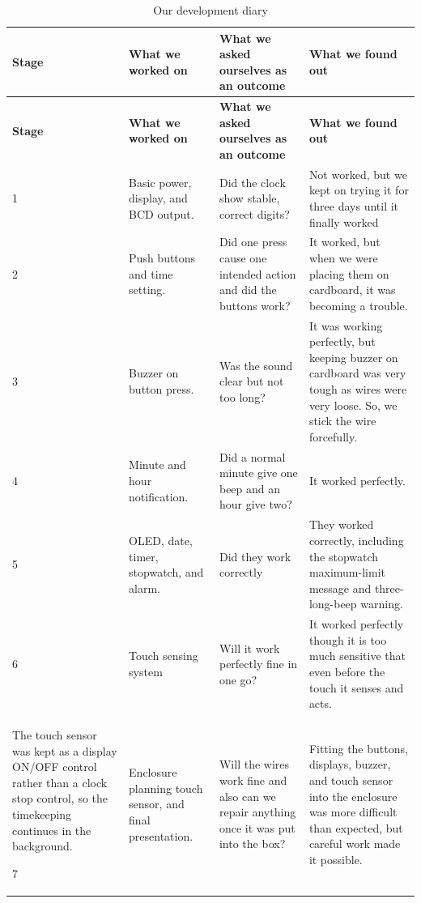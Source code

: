 \documentclass[12pt,letterpaper]{article}
\begin{document}
\begin{longtable}{
@{}p{17mm}p{40mm}p{43mm}p{46mm}@{}
}

\caption{
Our development diary
}

\label{tab:development-diary}
\\

\toprule

\textbf{Stage}
&
\textbf{What we worked on}
&
\textbf{What we asked ourselves as an outcome}
&
\textbf{What we found out}
\\

\midrule

\endfirsthead

\toprule

\textbf{Stage}
&
\textbf{What we worked on}
&
\textbf{What we asked ourselves as an outcome}
&
\textbf{What we found out}
\\

\midrule

\endhead

1
&
Basic power,
display,
and BCD output.
&
Did the clock show stable,
correct digits?
&
Not worked, but we kept on trying it for three days until it finally worked
\\

2
&
Push buttons
and time setting.
&
Did one press cause
one intended action and did the buttons work?
&
It worked, but when we were placing them on cardboard, it was becoming a trouble.
\\

3
&
Buzzer on button press.
&
Was the sound clear
but not too long?
&
It was working perfectly, but keeping buzzer on cardboard was very tough as wires were very loose. So, we stick the wire forcefully.
\\

4
&
Minute and hour notification.
&
Did a normal minute give one beep
and an hour give two?
&
It worked perfectly.
\\

5
&
OLED,
date,
timer,
stopwatch,
and alarm.
&
Did they work correctly
&
They worked correctly, including the stopwatch maximum-limit
message and three-long-beep warning.
\\

6
&
Touch sensing system
&
Will it work perfectly fine in one go?
&
It worked perfectly though it is too much sensitive that even before the touch it senses and acts.
\\

The touch sensor was kept as a display ON/OFF control rather than a clock
stop control, so the timekeeping continues in the background.

7
&
Enclosure planning
touch sensor,
and final presentation.
&
Will the wires work fine and also can we repair anything once it was put into the box?
&
Fitting the buttons, displays, buzzer, and touch sensor into the
enclosure was more difficult than expected, but careful work made
it possible.
\\

\bottomrule

\end{longtable}
\end{document}
